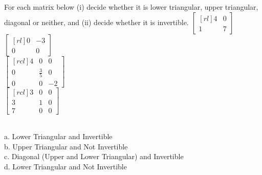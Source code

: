 \ii  For each matrix below (i) decide whether it is lower triangular, upper triangular, diagonal or neither, and (ii) decide whether it is invertible.
\bb
\ii
$
\begin{bmatrix}[rl]
4&0\\
1&7
\end{bmatrix}$ 
\vspace{.1in}\\
\ii $
\begin{bmatrix}[rl]
0&-3\\
0&0
\end{bmatrix}$ 
\vspace{.1in}\\
\ii $
\begin{bmatrix}[rcl]
4&0&0\\
0&\frac{3}{5}&0\\
0&0&-2
\end{bmatrix}$ 
\vspace{.1in}\\
\ii $
\begin{bmatrix}[rcl]
3&0&0\\
3&1&0\\
7&0&0
\end{bmatrix}$
\ee
\begin{solution}\ \\
a. Lower Triangular and Invertible\\
b. Upper Triangular and Not Invertible\\
c. Diagonal (Upper and Lower Triangular) and Invertible\\
d. Lower Triangular and Not Invertible
\end{solution}

